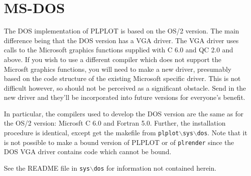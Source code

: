 \section{MS-DOS}

The DOS implementation of PLPLOT is based on the OS/2 version.  The main 
difference being that the DOS version has a VGA driver.  The VGA driver
uses calls to the Microsoft graphics functions supplied with C 6.0 and
QC 2.0 and above.  If you wish to use a different compiler which does not
support the Microsft graphics functions, you will need to make a new driver,
presumably based on the code structure of the existing Microsoft specific
driver.
This is not difficult however, so should not be perceived as a significant
obstacle.  Send in the new driver and they'll be incorporated into future
versions for everyone's benefit.

In particular, the compilers used to develop the DOS version are the same
as for the OS/2 version: Microsft C 6.0 and Fortran 5.0.  Further, the
installation procedure is identical, except get the makefile from
{\tt plplot$\backslash$sys$\backslash$dos}.  Note that it is not possible
to make a bound version of PLPLOT or of {\tt plrender} since the DOS VGA
driver contains code which cannot be bound.  

See the README file in {\tt sys$\backslash$dos} for information not
contained herein. 

